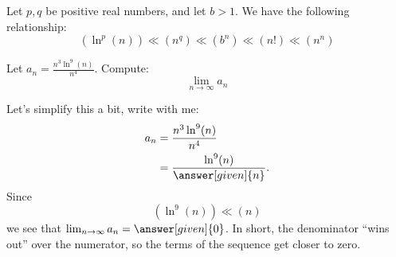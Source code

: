 \documentclass{ximera}
\begin{document}
\begin{theorem}
  Let $p,q$ be positive real numbers, and let $b> 1$. We have the
  following relationship:
  \[
  (\ln^p(n))\ll (n^q) \ll (b^n) \ll (n!) \ll (n^n)
  \]
\end{theorem}

\begin{example}
  Let $a_n  = \frac{n^3\ln^{9}(n)}{n^4}$. Compute:
  \[
  \lim_{n\to \infty}a_n
  \]
  \begin{explanation}
    Let's simplify this a bit, write with me:
    \begin{align*}
      a_n &= \frac{n^3\ln^{9}(n)}{n^4}\\
      &= \frac{\ln^{9}(n)}{\answer[given]{n}}.
    \end{align*}
    Since
    \[
    (\ln^{9}(n))\ll (n)
    \]
    we see that $\lim_{n\to\infty}a_n =\answer[given]{0}$.  In short, the 
    denominator ``wins out'' over the numerator, so the terms of the 
    sequence get closer to zero.
  \end{explanation}
\end{example}
\end{document}
